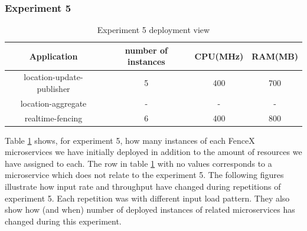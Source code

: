 \documentclass[a4]{report}
\begin{document}
    \subsubsection{Experiment 5}
    \begin{table}[h!]
        \centering
        \begin{tabular}{|c|c|c|c|}
            \hline
            Application               & number of instances & CPU(MHz) & RAM(MB) \\
            \hline
            location-update-publisher & 5                   & 400      & 700     \\
            location-aggregate        & -                   & -        & -       \\
            realtime-fencing          & 6                   & 400      & 800     \\
            \hline
        \end{tabular}
        \caption{Experiment 5 deployment view}
        \label{table:ex5-dv}
    \end{table}

    Table \ref{table:ex5-dv} shows, for experiment 5, how many instances of each FenceX microservices we have initially
    deployed in addition to the amount of resources we have assigned to each.
    The row in table \ref{table:ex5-dv} with no values corresponds to a microservice which does not relate to the
    experiment 5.
    The following figures illustrate how input rate and throughput have changed during repetitions of experiment 5.
    Each repetition was with different input load pattern.
    They also show how (and when) number of deployed instances of related microservices has changed during this
    experiment.
\end{document}
